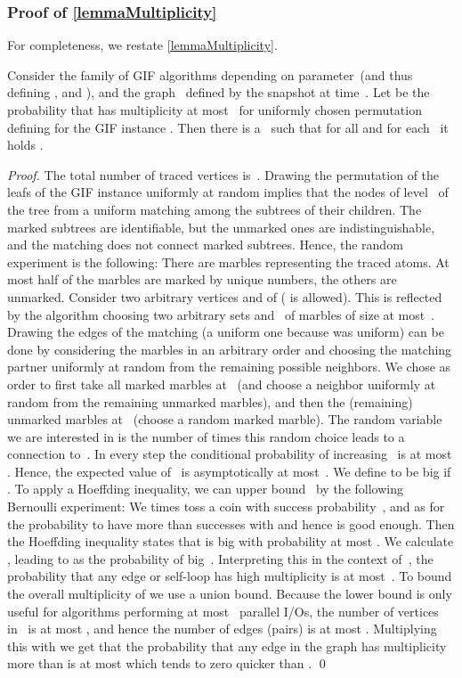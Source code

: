 \documentclass[envcountsame]{llncs}
\begin{document}
\subsubsection{Proof of \autoref{lemmaMultiplicity}}
For completeness, we restate \autoref{lemmaMultiplicity}.
\begin{lemma}\label{lemmaMultiplicityRestate}
	Consider the family of GIF algorithms depending on parameter~\memorySize (and thus defining , and \levelOfTracedAtoms), and the graph~ defined by the snapshot at time~.
	Let  be the probability that  has multiplicity at most~ for uniformly chosen permutation~ defining \binaryTreeOf{\gifInstance} for the GIF instance \gifInstance. 
	Then there is a~ such that for all  and for each~ it holds .
\end{lemma}
\begin{proof}
The total number of traced vertices is~.
Drawing the permutation of the leafs of the GIF instance uniformly at random implies that the nodes of level~ of the tree from a uniform matching among the subtrees of their children.
The marked subtrees are identifiable, but the unmarked ones are indistinguishable, and the matching does not connect marked subtrees.
Hence, the random experiment is the following:
There are marbles representing the traced atoms.
At most half of the marbles are marked by unique numbers, the others are unmarked.
Consider two arbitrary vertices  and  of  ( is allowed). 
This is reflected by the algorithm choosing two arbitrary sets  and~ of marbles of size at most~\memorySize.
Drawing the edges of the matching (a uniform one because  was uniform) can be done by considering the marbles in an arbitrary order and choosing the matching partner uniformly at random from the remaining possible neighbors.
We chose as order to first take all marked marbles at~ (and choose a neighbor uniformly at random from the remaining unmarked marbles), and then the (remaining) unmarked marbles at~ (choose a random marked marble). 
The random variable~ we are interested in is the number of times this random choice leads to a connection to~.
In every step the conditional probability of increasing~ is at most .
Hence, the expected value of~ is asymptotically at most~.
We define  to be big if .
To apply a Hoeffding inequality, we can upper bound~ by the following Bernoulli experiment:
We  times toss a coin with success probability~, and as for the probability to have more than  successes with  and hence  is good enough. 
Then the Hoeffding inequality states that  is big with probability at most .
We calculate , leading to  as the probability of big~.
Interpreting this in the context of~, the probability that any edge or self-loop has  high multiplicity is at most~.
To bound the overall multiplicity of  we use a union bound.
Because the lower bound is only useful for algorithms performing at most~ parallel I/Os, the number of vertices in~ is at most , and hence the number of edges (pairs) is at most .
Multiplying this with  we get that the probability that any edge in the graph has multiplicity more than  is at most  which tends to zero quicker than .
\qed
\end{proof}
\end{document}

